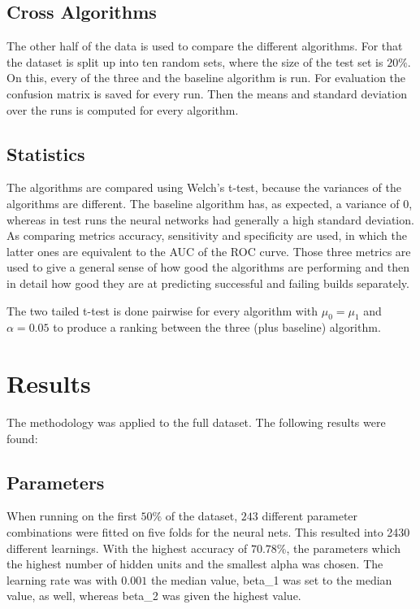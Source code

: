 \documentclass[a4paper,11pt]{article}
\begin{document}
\subsection{Cross Algorithms}

The other half of the data is used to compare the different algorithms. For that the dataset is split up into ten random sets, where the size of the test set is $20\%$. On this, every of the three and the baseline algorithm is run. For evaluation the confusion matrix is saved for every run. Then the means and standard deviation over the runs is computed for every algorithm.


\subsection{Statistics}

The algorithms are compared using Welch's t-test, because the variances of the algorithms are different. The baseline algorithm has, as expected, a variance of 0, whereas in test runs the neural networks had generally a high standard deviation. As comparing metrics accuracy, sensitivity and specificity are used, in which the latter ones are equivalent to the AUC of the ROC curve. Those three metrics are used to give a general sense of how good the algorithms are performing and then in detail how good they are at predicting successful and failing builds separately. 

The two tailed t-test is done pairwise for every algorithm with $\mu_0 = \mu_1$ and $\alpha=0.05$ to produce a ranking between the three (plus baseline) algorithm. 


\section{Results}

The methodology was applied to the full dataset. The following results were found:

\subsection{Parameters}

When running on the first $50\%$ of the dataset, $243$ different parameter combinations were fitted on five folds for the neural nets. This resulted into 2430 different learnings. With the highest accuracy of $70.78\%$, the parameters which the highest number of hidden units and the smallest alpha was chosen. The learning rate was with $0.001$ the median value, beta\_1 was set to the median value, as well, whereas beta\_2 was given the highest value. 
\end{document}
